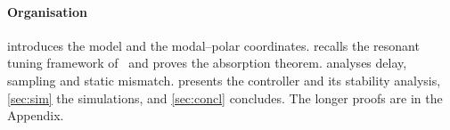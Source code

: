 \paragraph*{Organisation}
 introduces the model and the modal--polar coordinates.
 recalls the resonant tuning framework
of~\citet{juchem2026shaping} and proves the absorption theorem.
 analyses delay, sampling and static mismatch.
 presents the controller and its stability analysis,
\cref{sec:sim} the simulations, and \cref{sec:concl} concludes.
The longer proofs are in the Appendix.
